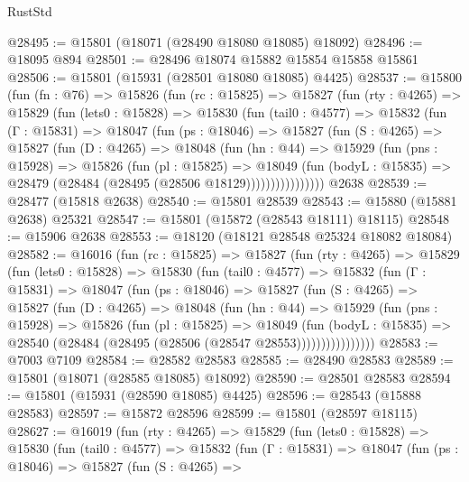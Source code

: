 \begin{lexlean}{RustStd}
\begin{coremodule}
@28495 := @15801 (@18071 (@28490 @18080 @18085) @18092)
@28496 := @18095 @894
@28501 := @28496 @18074 @15882 @15854 @15858 @15861
@28506 := @15801 (@15931 (@28501 @18080 @18085) @4425)
@28537 := @15800
    (fun (fn : @76) =>
    @15826
      (fun (rc : @15825) =>
      @15827
        (fun (rty : @4265) =>
        @15829
          (fun (lets0 : @15828) =>
          @15830
            (fun (tail0 : @4577) =>
            @15832
              (fun (Γ : @15831) =>
              @18047
                (fun (ps : @18046) =>
                @15827
                  (fun (S : @4265) =>
                  @15827
                    (fun (D : @4265) =>
                    @18048
                      (fun (hn : @44) =>
                      @15929
                        (fun (pns : @15928) =>
                        @15826
                          (fun (pl : @15825) =>
                          @18049
                            (fun (bodyL : @15835) =>
                            @28479 (@28484 (@28495 (@28506 @18129))))))))))))))))
    @2638
@28539 := @28477 (@15818 @2638)
@28540 := @15801 @28539
@28543 := @15880 (@15881 @2638) @25321
@28547 := @15801 (@15872 (@28543 @18111) @18115)
@28548 := @15906 @2638
@28553 := @18120 (@18121 @28548 @25324 @18082 @18084)
@28582 := @16016
    (fun (rc : @15825) =>
    @15827
      (fun (rty : @4265) =>
      @15829
        (fun (lets0 : @15828) =>
        @15830
          (fun (tail0 : @4577) =>
          @15832
            (fun (Γ : @15831) =>
            @18047
              (fun (ps : @18046) =>
              @15827
                (fun (S : @4265) =>
                @15827
                  (fun (D : @4265) =>
                  @18048
                    (fun (hn : @44) =>
                    @15929
                      (fun (pns : @15928) =>
                      @15826
                        (fun (pl : @15825) =>
                        @18049
                          (fun (bodyL : @15835) =>
                          @28540 (@28484 (@28495 (@28506 (@28547 @28553))))))))))))))))
@28583 := @7003 @7109
@28584 := @28582 @28583
@28585 := @28490 @28583
@28589 := @15801 (@18071 (@28585 @18085) @18092)
@28590 := @28501 @28583
@28594 := @15801 (@15931 (@28590 @18085) @4425)
@28596 := @28543 (@15888 @28583)
@28597 := @15872 @28596
@28599 := @15801 (@28597 @18115)
@28627 := @16019
    (fun (rty : @4265) =>
    @15829
      (fun (lets0 : @15828) =>
      @15830
        (fun (tail0 : @4577) =>
        @15832
          (fun (Γ : @15831) =>
          @18047
            (fun (ps : @18046) =>
            @15827
              (fun (S : @4265) =>

\end{coremodule}
\end{lexlean}
